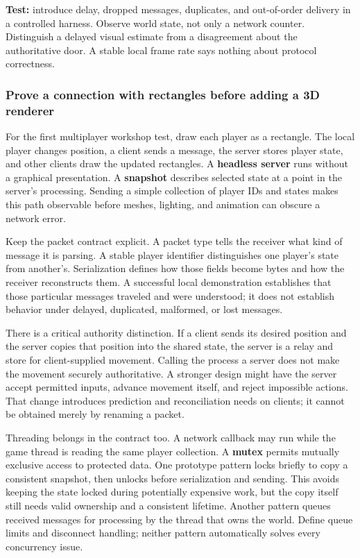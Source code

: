 \textbf{Test:} introduce delay, dropped messages, duplicates, and out-of-order delivery in a controlled harness. Observe world state, not only a network counter. Distinguish a delayed visual estimate from a disagreement about the authoritative door. A stable local frame rate says nothing about protocol correctness.

\subsubsection{Prove a connection with rectangles before adding a 3D renderer}\label{06-engine-ii-ch040-prove-a-connection-with-rectangles-before-adding-a-3d-renderer}

For the first multiplayer workshop test, draw each player as a rectangle. The local player changes position, a client sends a message, the server stores player state, and other clients draw the updated rectangles. A \textbf{headless server} runs without a graphical presentation. A \textbf{snapshot} describes selected state at a point in the server's processing. Sending a simple collection of player IDs and states makes this path observable before meshes, lighting, and animation can obscure a network error.

Keep the packet contract explicit. A packet type tells the receiver what kind of message it is parsing. A stable player identifier distinguishes one player's state from another's. Serialization defines how those fields become bytes and how the receiver reconstructs them. A successful local demonstration establishes that those particular messages traveled and were understood; it does not establish behavior under delayed, duplicated, malformed, or lost messages.

There is a critical authority distinction. If a client sends its desired position and the server copies that position into the shared state, the server is a relay and store for client-supplied movement. Calling the process a server does not make the movement securely authoritative. A stronger design might have the server accept permitted inputs, advance movement itself, and reject impossible actions. That change introduces prediction and reconciliation needs on clients; it cannot be obtained merely by renaming a packet.

Threading belongs in the contract too. A network callback may run while the game thread is reading the same player collection. A \textbf{mutex} permits mutually exclusive access to protected data. One prototype pattern locks briefly to copy a consistent snapshot, then unlocks before serialization and sending. This avoids keeping the state locked during potentially expensive work, but the copy itself still needs valid ownership and a consistent lifetime. Another pattern queues received messages for processing by the thread that owns the world. Define queue limits and disconnect handling; neither pattern automatically solves every concurrency issue.

